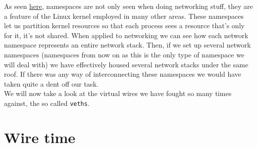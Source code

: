         As seen \href{https://en.wikipedia.org/wiki/Linux_namespaces}{here}, namespaces are not only seen when doing networking stuff, they are a feature of the Linux kernel employed in many other areas. These namespaces let us partition kernel resources so that each process sees a resource that's only for it, it's not shared. When applied to networking we can see how each network namespace represents an entire network stack. Then, if we set up several network namespaces (namespaces from now on as this is the only type of namespace we will deal with) we have effectively housed several network stacks under the same roof. If there was any way of interconnecting these namespaces we would have taken quite a dent off our task.\\

        We will now take a look at the virtual wires we have fought so many times against, the so called \texttt{veths}.\\

    \section{Wire time}